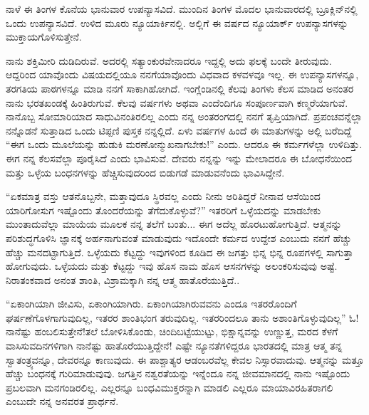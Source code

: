 \vspace{0.1cm}

ನಾಳೆ ಈ ತಿಂಗಳ ಕೊನೆಯ ಭಾನುವಾರ ಉಪನ್ಯಾಸವಿದೆ. ಮುಂದಿನ ತಿಂಗಳ ಮೊದಲ ಭಾನುವಾರದಲ್ಲಿ ಬ್ರೂಕ್ಲಿನ್‌ನಲ್ಲಿ ಒಂದು ಉಪನ್ಯಾಸವಿದೆ. ಉಳಿದ ಮೂರು ನ್ಯೂಯಾರ್ಕಿನಲ್ಲಿ. ಅಲ್ಲಿಗೆ ಈ ವರ್ಷದ ನ್ಯೂಯಾರ್ಕ್ ಉಪನ್ಯಾಸಗಳನ್ನು ಮುಕ್ತಾಯಗೊಳಿಸುತ್ತೇನೆ.

\vspace{0.1cm}

ನಾನು ಶಕ್ತಿಮೀರಿ ದುಡಿದಿರುವೆ. ಅದರಲ್ಲಿ ಸತ್ಯಾಂಕುರವೇನಾದರೂ ಇದ್ದಲ್ಲಿ ಅದು ಫಲಕ್ಕೆ ಬಂದೇ ತೀರುವುದು. ಆದ್ದರಿಂದ ಯಾವೊಂದು ವಿಷಯದಲ್ಲಿಯೂ ನನಗೆ\break ಯಾವೊಂದು ವಿಧವಾದ ಕಳವಳವೂ ಇಲ್ಲ. ಈ ಉಪನ್ಯಾಸಗಳನ್ನೂ, ತರಗತಿಯ ಪಾಠಗಳನ್ನೂ ಮಾಡಿ ನನಗೆ ಸಾಕಾಗಿಹೋಗಿದೆ. ಇಂಗ್ಲೆಂಡಿನಲ್ಲಿ ಕೆಲವು ತಿಂಗಳು ಕೆಲಸ ಮಾಡಿದ ಅನಂತರ ನಾನು ಭರತಖಂಡಕ್ಕೆ ಹಿಂತಿರುಗುವೆ. ಕೆಲವು ವರ್ಷಗಳು ಅಥವಾ ಎಂದೆಂದಿಗೂ ಸಂಪೂರ್ಣವಾಗಿ ಕಣ್ಮರೆಯಾಗುವೆ. ನಾನೊಬ್ಬ ಸೋಮಾರಿಯಾದ ಸಾಧುವಿನಂತಿರಲಿಲ್ಲ ಎಂದು ನನ್ನ ಅಂತರಂಗದಲ್ಲಿ ನನಗೆ ತೃಪ್ತಿಯಾಗಿದೆ. ಪ್ರಪಂಚವನ್ನೆಲ್ಲಾ ನನ್ನೊಡನೆ ಸುತ್ತಾಡಿದ ಒಂದು ಟಿಪ್ಪಣಿ ಪುಸ್ತಕ ನನ್ನಲ್ಲಿದೆ. ಏಳು ವರ್ಷಗಳ ಹಿಂದೆ ಈ ಮಾತುಗಳನ್ನು ಅಲ್ಲಿ ಬರೆದಿದ್ದೆ\enginline{-} “ಈಗ ಒಂದು ಮೂಲೆಯನ್ನು ಹುಡುಕಿ ಮರಣೋನ್ಮುಖನಾಗಬೇಕು!” ಎಂದು. ಆದರೂ ಈ ಕರ್ಮಗಳೆಲ್ಲಾ ಉಳಿದಿತ್ತು. ಈಗ ನನ್ನ ಕೆಲಸವೆಲ್ಲಾ ಪೂರೈಸಿದೆ ಎಂದು ಭಾವಿಸುವೆ. ದೇವರು ನನ್ನನ್ನು ಇನ್ನು ಮೇಲಾದರೂ ಈ ಬೋಧನೆಯಿಂದ ಮತ್ತು ಒಳ್ಳೆಯ ಬಂಧನಗಳನ್ನು ಹೆಚ್ಚಿಸುವುದರಿಂದ ಬಿಡುಗಡೆ ಮಾಡುವನೆಂದು ಭಾವಿಸಿದ್ದೇನೆ.

\vspace{0.3cm}

“ಏಕಮಾತ್ರ ವಸ್ತು ಆತನೊಬ್ಬನೇ, ಮತ್ತಾವುದೂ ಸ್ಥಿರವಲ್ಲ ಎಂದು ನೀನು ಅರಿತಿದ್ದರೆ ನೀನಾವ ಆಸೆಯಿಂದ ಯಾರಿಗೋಸುಗ ಇಷ್ಟೊಂದು ತೊಂದರೆಯನ್ನು ತೆಗೆದುಕೊಳ್ಳುವೆ?” ಇತರರಿಗೆ ಒಳ್ಳೆಯದನ್ನು ಮಾಡಬೇಕು ಮುಂತಾದುವೆಲ್ಲಾ ಮಾಯೆಯ ಮೂಲಕ ನನ್ನ ತಲೆಗೆ ಬಂತು... ಈಗ ಅದೆಲ್ಲ ಹೊರಟುಹೋಗುತ್ತಿದೆ. ಆತ್ಮನನ್ನು ಪರಿಶುದ್ಧಗೊಳಿಸಿ ಜ್ಞಾನಕ್ಕೆ ಅರ್ಹನಾಗುವಂತೆ ಮಾಡುವುದು\enginline{-} ಇದೊಂದೇ ಕರ್ಮದ ಉದ್ದೇಶ ಎಂಬುದು ನನಗೆ ಹೆಚ್ಚು ಹೆಚ್ಚು ಮನದಟ್ಟಾಗುತ್ತಿದೆ. ಒಳ್ಳೆಯದು ಕೆಟ್ಟದ್ದು ಇವುಗಳಿಂದ ಕೂಡಿದ ಈ ಜಗತ್ತು ಭಿನ್ನ ಭಿನ್ನ ರೂಪಗಳಲ್ಲಿ ಸಾಗುತ್ತಾ ಹೋಗುವುದು. ಒಳ್ಳೆಯದು ಮತ್ತು ಕೆಟ್ಟದ್ದು ಇವು ಹೊಸ ನಾಮ ಹೊಸ ಆಸನಗಳನ್ನು ಅಲಂಕರಿಸುವುವು ಅಷ್ಟೆ. ನಿರಾತಂಕವಾದ ಅನಂತ ಶಾಂತಿ, ವಿಶ್ರಾಮಕ್ಕಾಗಿ ನನ್ನ ಆತ್ಮ ಹಾತೊರೆಯುತ್ತಿದೆ..

\vspace{0.3cm}

“ಏಕಾಂಗಿಯಾಗಿ ಜೀವಿಸು, ಏಕಾಂಗಿಯಾಗಿರು. ಏಕಾಂಗಿಯಾಗಿರುವವನು ಎಂದೂ ಇತರರೊಂದಿಗೆ ಘರ್ಷಣೆಗೊಳಗಾಗುವುದಿಲ್ಲ, ಇತರರ ಶಾಂತಿಭಂಗ ತರುವುದಿಲ್ಲ. ಇತರರಿಂದಲೂ ತಾನು ಅಶಾಂತಿಗೊಳ್ಳುವುದಿಲ್ಲ” ಓ!ನಾನೆಷ್ಟು ಹಂಬಲಿಸುತ್ತೇನೆ!ತಲೆ ಬೋಳಿಸಿಕೊಂಡು, ಚಿಂದಿಬಟ್ಟೆಯುಟ್ಟು, ಭಿಕ್ಷಾನ್ನವನ್ನು ಉಣ್ಣುತ್ತ, ಮರದ ಕೆಳಗೆ ವಾಸಿಸುವದಿನಗಳಿಗಾಗಿ ನಾನೆಷ್ಟು ಹಾತೊರೆಯುತ್ತಿದ್ದೇನೆ! ಎಷ್ಟೇ ನ್ಯೂನತೆಗಳಿದ್ದರೂ ಭಾರತದಲ್ಲಿ ಮಾತ್ರ ಆತ್ಮ ತನ್ನ ಸ್ವಾತಂತ್ರ್ಯವನ್ನೂ, ದೇವರನ್ನೂ ಕಾಣುವುದು. ಈ ಪಾಶ್ಚಾತ್ಯರ ಆಡಂಬರವೆಲ್ಲ ಕೇವಲ ನಿಸ್ಸಾರವಾದುವು. ಆತ್ಮನನ್ನು ಮತ್ತೂ ಹೆಚ್ಚು ಬಂಧನಕ್ಕೆ ಗುರಿಮಾಡುವುವು. ಜಗತ್ತಿನ ನಶ್ವರತೆಯನ್ನು ಇನ್ನೆಂದೂ ನನ್ನ ಜೀವಮಾನದಲ್ಲಿ ನಾನು ಇಷ್ಟೊಂದು ಪ್ರಬಲವಾಗಿ ಮನಗಂಡಿರಲಿಲ್ಲ. ಎಲ್ಲರನ್ನೂ ಬಂಧವಿಮುಕ್ತರನ್ನಾಗಿ ಮಾಡಲಿ \enginline{-} ಎಲ್ಲರೂ ಮಾಯಾವಿರಹಿತರಾಗಲಿ ಎಂಬುದೇ ನನ್ನ ಅನವರತ ಪ್ರಾರ್ಥನೆ.

